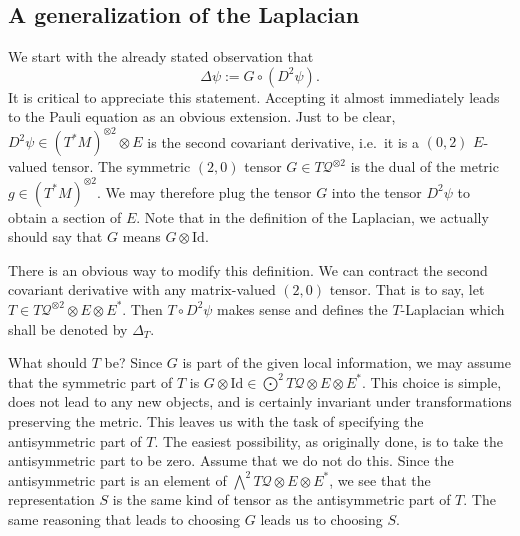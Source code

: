 \documentclass[11pt]{article}
\theoremstyle{remark}
\begin{document}
\subsection{A generalization of the Laplacian}
 
We start with the already stated observation that 
\[
\ensuremath{\Delta} \ensuremath{\psi} \ensuremath{:=} G \circ (D^2 \ensuremath{\psi}).\] 
It is critical to appreciate this statement. Accepting it almost 
immediately leads to the Pauli equation as an obvious extension. 
Just
to be clear,  $D^2 \ensuremath{\psi} \in (T^*M)^{\otimes
2} \otimes \ensuremath{E}$ is the second covariant derivative, i.e.\ it is a
$(0,2)$ $E$-valued tensor.  The symmetric 
$(2,0)$ tensor $G \in \ensuremath{T \ensuremath{\mathcal{Q}}}^{\otimes 2}$ 
is the dual of the metric $g \in (T^*M)^{\otimes
2}$. We may therefore plug the tensor $G$ into
the tensor $D^2 \ensuremath{\psi}$ to obtain a section of $E$. Note that in the
definition of the Laplacian, we actually should say that $G$ means
 $G \otimes \ensuremath{\text{Id}}$. 

There is an obvious way to modify this definition. We can contract the
second covariant derivative with any matrix-valued $(2,0)$ tensor. 
That is to say,
let $T \in  \ensuremath{T \ensuremath{\mathcal{Q}}}^{\otimes 2} \otimes \ensuremath{E} \otimes \ensuremath{{\ensuremath{E}}^{*}}$. Then $T
\circ D^2 \ensuremath{\psi}$ makes sense and defines the $T$-Laplacian which shall
be denoted by $\ensuremath{\Delta}_T$.


What should $T$ be? 
Since $G$ is
part of the given local information, 
we may assume that the symmetric
part of $T$ 
is $G \otimes \ensuremath{\text{Id}} \in \ensuremath{\bigodot^{2}{\ensuremath{T \ensuremath{\mathcal{Q}}}}} \otimes \ensuremath{E} \otimes \ensuremath{{\ensuremath{E}}^{*}}$. 
This choice is  simple, does
not lead to any new objects, and is certainly invariant under
transformations preserving the metric. This leaves us with the task of
specifying the antisymmetric part of $T$. The easiest possibility, as
originally done, is to take the antisymmetric part to be zero. Assume that we
do not do this. Since the antisymmetric part is an element of 
 $\ensuremath{\bigwedge^{2}{\ensuremath{T \ensuremath{\mathcal{Q}}}}} \otimes \ensuremath{E} \otimes
\ensuremath{{\ensuremath{E}}^{*}}$, we see that the representation $S$ is the same kind of
tensor as the antisymmetric part of $T$. The same reasoning that leads
to choosing $G$ leads us to choosing $S$.
\end{document}
